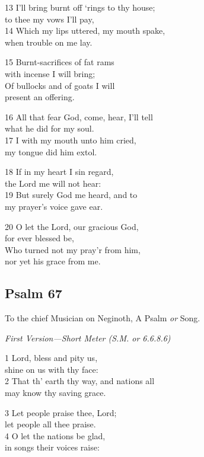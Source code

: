 \begin{multicols}{3}
13 I’ll bring burnt off ‘rings to thy house;\\
to thee my vows I’ll pay,\\
14 Which my lips uttered, my mouth spake,\\
when trouble on me lay.

15 Burnt-sacrifices of fat rams\\
with incense I will bring;\\
Of bullocks and of goats I will\\
present an offering.

16 All that fear God, come, hear, I’ll tell\\
what he did for my soul.\\
17 I with my mouth unto him cried,\\
my tongue did him extol.

18 If in my heart I sin regard,\\
the Lord me will not hear:\\
19 But surely God me heard, and to\\
my prayer’s voice gave ear.

20 O let the Lord, our gracious God,\\
for ever blessed be,\\
Who turned not my pray’r from him,\\
nor yet his grace from me.

\begin{center}
\quad{}\quad{}
\end{center}

\subsection*{Psalm 67}

To the chief Musician on Neginoth,
A Psalm \emph{or} Song.

\emph{First Version---Short Meter (S.M. or 6.6.8.6)}

1 Lord, bless and pity us,\\
shine on us with thy face:\\
2 That th’ earth thy way, and nations all\\
may know thy saving grace.

3 Let people praise thee, Lord;\\
let people all thee praise.\\
4 O let the nations be glad,\\
in songs their voices raise:


\end{multicols}
